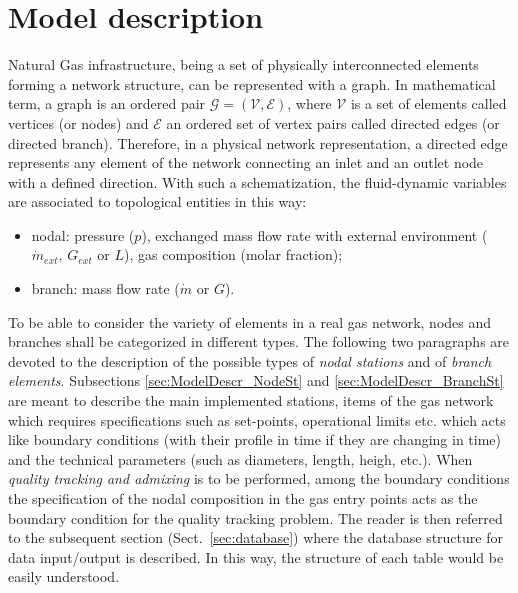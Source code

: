 \clearpage
\section{Model description}
\label{sec:ModelDescr}

Natural Gas infrastructure, being a set of physically interconnected elements forming a network structure, can be represented with a graph. In mathematical term, a graph is an ordered pair $\mathcal{G} = (\mathcal{V}, \mathcal{E})$, where $\mathcal{V}$  is a set of elements called vertices (or nodes) and $\mathcal{E}$  an ordered set of vertex pairs called directed edges (or directed branch). Therefore, in a physical network representation, a directed edge represents any element of the network connecting an inlet and an outlet node with a defined direction. With such a schematization, the fluid-dynamic variables are associated to topological entities in this way:

\begin{itemize}
    \item nodal: pressure ($p$), exchanged mass flow rate with external environment ($\dot m_{ext}$, $G_{ext}$ or $L$), gas composition (molar fraction);
    \item branch: mass flow rate ($\dot m$ or $G$).
\end{itemize}

To be able to consider the variety of elements in a real gas network, nodes and branches shall be categorized in different types.
The following two paragraphs are devoted to the description of the possible types of \textit{nodal stations} and of \textit{branch elements}.
Subsections \ref{sec:ModelDescr_NodeSt} and \ref{sec:ModelDescr_BranchSt} are meant to describe the main implemented stations, items of the gas network which requires specifications such as set-points, operational limits etc. which acts like boundary conditions (with their profile in time if they are changing in time) and the technical parameters (such as diameters, length, heigh, etc.). When \textit{quality tracking and admixing} is to be performed, among the boundary conditions the specification of the nodal composition in the gas entry points acts as the boundary condition for the quality tracking problem.
The reader is then referred to the subsequent section (Sect.~\ref{sec:database}) where the database structure for data input/output is described. In this way, the structure of each table would be easily understood.

